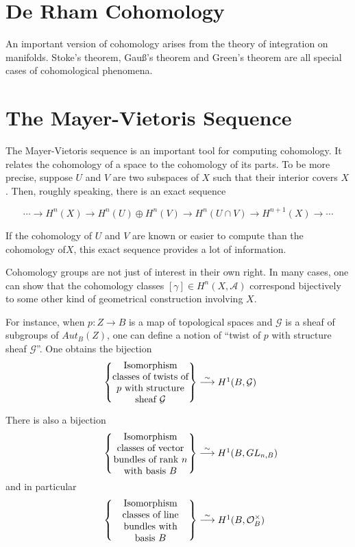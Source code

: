 \section{De Rham Cohomology}

An important version of cohomology arises from the theory of integration on manifolds. Stoke's theorem, Gauß's theorem and Green's theorem are all special cases of cohomological phenomena.

\section{The Mayer-Vietoris Sequence}

The Mayer-Vietoris sequence is an important tool for computing cohomology. It relates the cohomology of a space to the cohomology of its parts. To be more precise, suppose $U$ and $V$ are two subspaces of $X$ such that their interior covers $X$. Then, roughly speaking, there is an exact sequence

$$
\cdots \to H^n(X) \to H^n(U) \oplus  H^n(V) \to H^n(U\cap V) \to H^{n+1}(X) \to \cdots      
$$

If the cohomology of $U$ and $V$ are known or easier to compute than the cohomology of$X$, this exact sequence provides a lot of information.


Cohomology groups are not just of interest in their own right. In many cases, one can show that the cohomology classes $[\gamma] \in H^n(X, \mathcal{A})$ correspond bijectively to some other kind of geometrical construction involving $X$.

For instance, when $p:Z \to B$ is a map of topological spaces and $\mathcal{G}$  is a sheaf of subgroups of $Aut_B(Z)$, one can define a notion of “twist of $p$ with structure sheaf $\mathcal{G}$”. One obtains the bijection
\begin{align}
            \left\{ \parbox[c]{1.1in}{\centering
                       Isomorphism classes of twists of $p$
                       with structure sheaf $\mathcal{G}$}
            \right\}
            \stackrel{\sim}{\longrightarrow}
            \parbox[c]{0.5in}{\centering
                       $H^1(B, \mathcal{G})$}
\end{align}

There is also a bijection
\begin{align}
            \left\{ \parbox[c]{1.1in}{\centering
              Isomorphism classes of vector bundles of rank $n$ with basis $B$}
            \right\}
            \stackrel{\sim}{\longrightarrow}
            \parbox[c]{0.5in}{\centering
            $H^1(B, GL_{n,B})$}
\end{align}
and in particular
\begin{align}
            \left\{ \parbox[c]{1.1in}{\centering
            Isomorphism classes of line bundles with basis $B$}
            \right\}
            \stackrel{\sim}{\longrightarrow}
            \parbox[c]{0.5in}{\centering
                $H^1(B, \mathcal{O}_B^\times)$}
\end{align}

